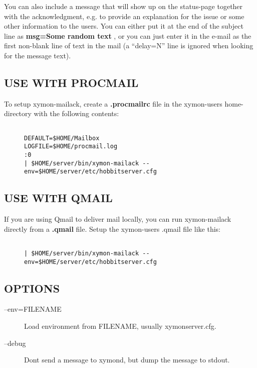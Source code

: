   You can also include a message that will show up on the status-page together with the acknowledgment, e.g. to provide an explanation for the issue or some other information to the users. You can either put it at the end of the subject line as \textbf{msg=Some random text}
, or you can just enter it in the e-mail as the first non-blank line of text in the mail (a ``delay=N'' line is ignored when looking for the message text). 


 
\subsection{USE WITH PROCMAIL}
 To setup xymon-mailack, create a \textbf{.procmailrc}
 file in the xymon-users home-directory with the following contents: \begin{description}
\item[]\begin{verbatim}

DEFAULT=$HOME/Mailbox
LOGFILE=$HOME/procmail.log
:0
| $HOME/server/bin/xymon-mailack --env=$HOME/server/etc/hobbitserver.cfg

\end{verbatim}


 


\end{description}
\subsection{USE WITH QMAIL}
 If you are using Qmail to deliver mail locally, you can run xymon-mailack directly from a \textbf{.qmail}
 file. Setup the xymon-users .qmail file like this: \begin{description}
\item[]\begin{verbatim}

| $HOME/server/bin/xymon-mailack --env=$HOME/server/etc/hobbitserver.cfg

\end{verbatim}


 


\end{description}
\subsection{OPTIONS}
\begin{description}
\item[--env=FILENAME] Load environment from FILENAME, usually xymonserver.cfg. 

 

\item[--debug] Dont send a message to xymond, but dump the message to stdout. 

 


\end{description}
